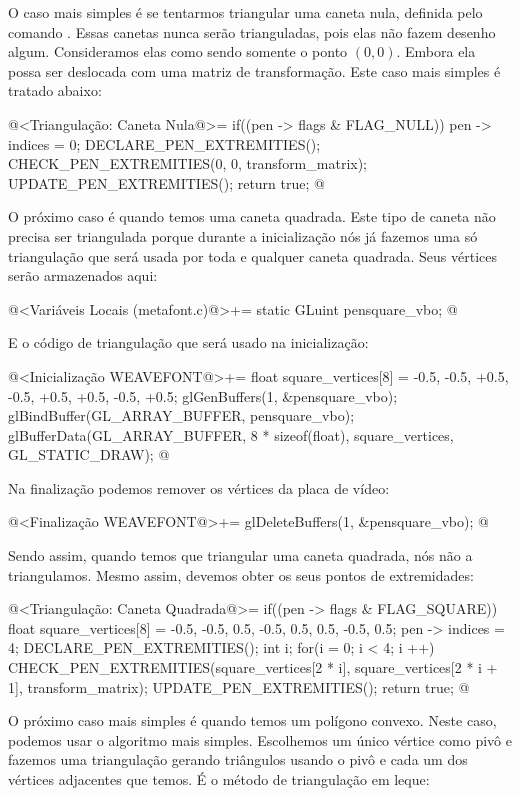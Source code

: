 {{{{{{O caso mais simples é se tentarmos triangular uma caneta nula,
definida pelo comando . Essas canetas nunca serão
trianguladas, pois elas não fazem desenho algum. Consideramos elas
como sendo somente o ponto $(0, 0)$. Embora ela possa ser deslocada
com uma matriz de transformação. Este caso mais simples é tratado
abaixo:

\iniciocodigo
@<Triangulação: Caneta Nula@>=
if((pen -> flags & FLAG_NULL)){
  pen -> indices = 0;
  DECLARE_PEN_EXTREMITIES();
  CHECK_PEN_EXTREMITIES(0, 0, transform_matrix);
  UPDATE_PEN_EXTREMITIES();
  return true;
}
@
\fimcodigo

O próximo caso é quando temos uma caneta quadrada. Este tipo de caneta
não precisa ser triangulada porque durante a inicialização nós já
fazemos uma só triangulação que será usada por toda e qualquer caneta
quadrada. Seus vértices serão armazenados aqui:

\iniciocodigo
@<Variáveis Locais (metafont.c)@>+=
static GLuint pensquare_vbo;
@
\fimcodigo

E o código de triangulação que será usado na inicialização:

\iniciocodigo
@<Inicialização WEAVEFONT@>+=
{
  float square_vertices[8] = {-0.5, -0.5,
                               +0.5, -0.5,
                               +0.5, +0.5,
                               -0.5, +0.5};
  glGenBuffers(1, &pensquare_vbo);
  glBindBuffer(GL_ARRAY_BUFFER, pensquare_vbo);
  glBufferData(GL_ARRAY_BUFFER, 8 * sizeof(float), square_vertices,
               GL_STATIC_DRAW);
}
@
\fimcodigo

Na finalização podemos remover os vértices da placa de vídeo:

\iniciocodigo
@<Finalização WEAVEFONT@>+=
glDeleteBuffers(1, &pensquare_vbo);
@
\fimcodigo

Sendo assim, quando temos que triangular uma caneta quadrada, nós não
a triangulamos. Mesmo assim, devemos obter os seus pontos de
extremidades:

\iniciocodigo
@<Triangulação: Caneta Quadrada@>=
if((pen -> flags & FLAG_SQUARE)){
  float square_vertices[8] = {-0.5, -0.5, 0.5, -0.5, 0.5, 0.5, -0.5, 0.5};
  pen -> indices = 4;
  DECLARE_PEN_EXTREMITIES();
  int i;
  for(i = 0; i < 4; i ++)
    CHECK_PEN_EXTREMITIES(square_vertices[2 * i], square_vertices[2 * i + 1],
                          transform_matrix);
  UPDATE_PEN_EXTREMITIES();
  return true;
}
@
\fimcodigo

O próximo caso mais simples é quando temos um polígono convexo. Neste
caso, podemos usar o algoritmo mais simples. Escolhemos um único
vértice como pivô e fazemos uma triangulação gerando triângulos usando
o pivô e cada um dos vértices adjacentes que temos. É o método de
triangulação em leque:

}}}}}}

